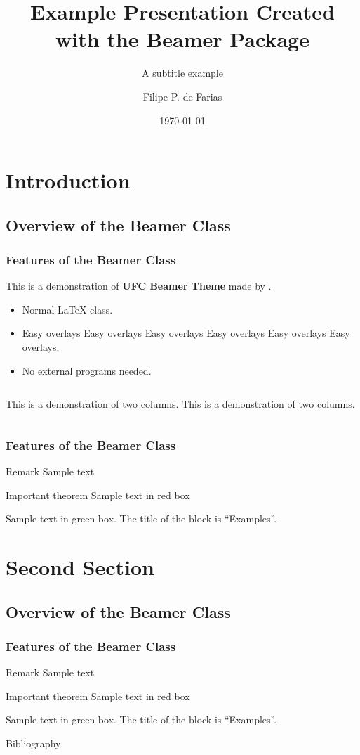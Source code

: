 \documentclass[usenames,dvipsnames,aspectratio=149, 8pt]{beamer}
\title[\textbf{\uppercase{Smaller Title}}]{Example Presentation Created with the Beamer Package}
\subtitle{A subtitle example}
\author[F. P. Farias]{Filipe P. de Farias}
\institute[UFC]{Department of Teleinformatics Engineering\\Universidade Federal do Ceará}
\date{\today}
\begin{document}
\frame{\titlepage}

\section{Introduction}
\subsection{Overview of the Beamer Class}

\frame
{\justifying
\frametitle{Features of the Beamer Class}

This is a demonstration of {\bf\color{UFCOrange}UFC Beamer Theme} made by \insertshortauthor{}.

\begin{itemize}
\item<1-> Normal LaTeX class.
\item<2-> Easy overlays Easy overlays Easy overlays Easy overlays Easy overlays Easy overlays.
\item<3-> No external programs needed.      
\end{itemize}

\begin{columns}
This is a demonstration of two columns.
This is a demonstration of two columns.
\end{columns}
}

\frame
{\frametitle{Features of the Beamer Class}

    \begin{block}{Remark}
    Sample text
    \end{block}
    
    \begin{alertblock}{Important theorem}
    Sample text in red box
    \end{alertblock}
    
    \begin{examples}
    Sample text in green box. The title of the block is ``Examples''.
    \end{examples}

}
\section{Second Section}
\subsection{Overview of the Beamer Class}
\frame
{
  \frametitle{Features of the Beamer Class}

    \begin{block}{Remark}
    Sample text
    \end{block}
    
    \begin{alertblock}{Important theorem}
    Sample text in red box
    \end{alertblock}
    
    \begin{examples}
    Sample text in green box. The title of the block is ``Examples''. \cite{article1}
    \end{examples}

}

\nocite{*}
\begin{frame}[allowframebreaks]{Bibliography}
\printbibliography
\end{frame}
\end{document}

